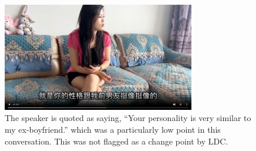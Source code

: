 \documentclass[12pt]{article}
\begin{document}
\begin{figure}[H]
    \centering
    \includegraphics[width=0.75\textwidth]{./analysis/change_point.png}
    \caption{The speaker is quoted as saying, ``Your personality is very similar to my ex-boyfriend.'' which was a particularly low point in this conversation. This was not flagged as a change point by LDC.}
    \label{fig:change_point}
\end{figure}
\end{document}
